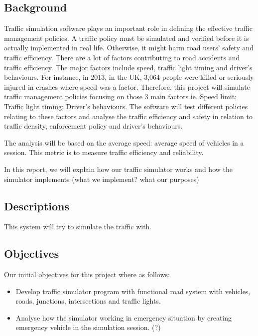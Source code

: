 \documentclass[11pt]{article}
\begin{document}
\subsection{Background}
Traffic simulation software plays an important role in defining the effective traffic management policies. A traffic policy must be simulated and verified before it is actually implemented in real life. Otherwise, it might harm road users’ safety and traffic efficiency. There are a lot of factors contributing to road accidents and traffic efficiency. The major factors include speed, traffic light timing and driver’s behaviours. For instance, in 2013, in the UK, 3,064 people were killed or seriously injured in crashes where speed was a factor.
Therefore, this project will simulate traffic management policies focusing on those 3 main factors ie. Speed limit; Traffic light timing; Driver's behaviours. The software will test different policies relating to these factors and analyse the traffic efficiency and safety in relation to traffic density, enforcement policy and driver's behaviours.

The analysis will be based on the average speed: average speed of vehicles in a session. This metric is to measure traffic efficiency and reliability.

In this report, we will explain how our traffic simulator works and how the simulator implements (what we implement? what our purposes)
	
\subsection{Descriptions}
This system will try to simulate the traffic with.

\subsection{Objectives}
Our initial objectives for this project where as follows:
\begin{itemize}[noitemsep]
\item Develop traffic simulator program with functional road system with vehicles, roads, junctions, intersections and traffic lights.
\item Analyse how the simulator working in emergency situation by creating emergency vehicle in the simulation session. (?)
\end{itemize}
\end{document}
